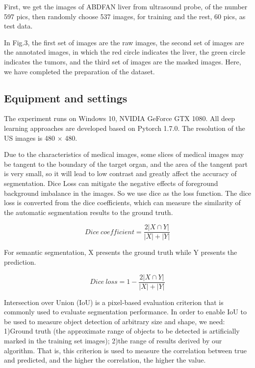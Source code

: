 \documentclass[a4paper]{article}
\begin{document}
First, we get the images of ABDFAN liver from ultrasound probe, of the number 597 pics, then randomly choose 537 images,  for training and the rest, 60 pics, as test data.


In Fig.3, the first set of images are the raw images, the second set of images are the annotated images, in which the red circle indicates the liver, the green circle indicates the tumors, and the third set of images are the masked images. Here, we have completed the preparation of the dataset.

\subsection{Equipment and settings}

The experiment runs on Windows 10, NVIDIA GeForce GTX 1080. All deep learning approaches are developed based on Pytorch 1.7.0. The resolution of the US images is 480 $ \times $ 480.

Due to the characteristics of medical images, some slices of medical images may be tangent to the boundary of the target organ, and the area of the tangent part is very small, so it will lead to low contrast and greatly affect the accuracy of segmentation. Dice Loss can mitigate the negative effects of foreground background imbalance in the images. So we use dice as the loss function\cite{r10}. The dice loss is converted from the dice coefficients, which can measure the similarity of the automatic segmentation results to the ground truth.

\begin{equation}
	Dice \ coefficient = \frac{2|X \cap Y|}{|X|+|Y|}
	\label{eqn: eq1}
\end{equation}

For semantic segmentation, X presents the ground truth while Y presents the prediction.

\begin{equation}
	Dice \ loss = 1 - \frac{2|X \cap Y|}{|X|+|Y|}
	\label{eqn: eq1}
\end{equation}

Intersection over Union (IoU)\cite{i2} is a pixel-based evaluation criterion that is commonly used to evaluate segmentation performance. In order to enable IoU to be used to measure object detection of arbitrary size and shape, we need: 1)Ground truth (the approximate range of objects to be detected is artificially marked in the training set images); 2)the range of results derived by our algorithm. That is, this criterion is used to measure the correlation between true and predicted, and the higher the correlation, the higher the value.
\end{document}
